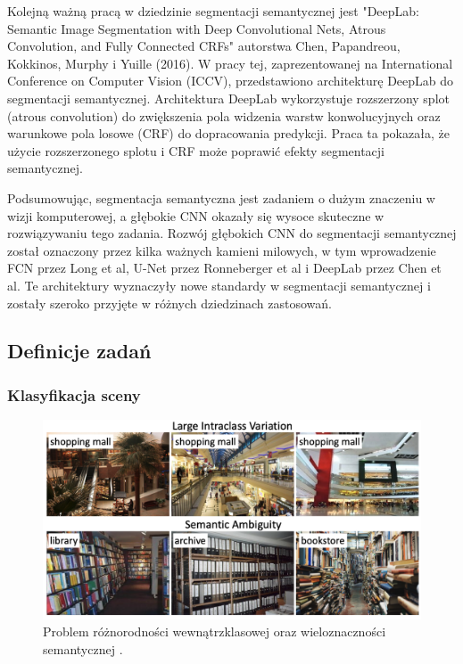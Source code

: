 Kolejną ważną pracą w dziedzinie segmentacji semantycznej jest "DeepLab: Semantic Image Segmentation with Deep Convolutional Nets, Atrous Convolution, and Fully Connected CRFs" autorstwa Chen, Papandreou, Kokkinos, Murphy i Yuille (2016)\cite{deeplab}. W pracy tej, zaprezentowanej na International Conference on Computer Vision (ICCV), przedstawiono architekturę DeepLab do segmentacji semantycznej. Architektura DeepLab wykorzystuje rozszerzony splot (atrous convolution) do zwiększenia pola widzenia warstw konwolucyjnych oraz warunkowe pola losowe (CRF) do dopracowania predykcji. Praca ta pokazała, że użycie rozszerzonego splotu i CRF może poprawić efekty segmentacji semantycznej.

Podsumowując, segmentacja semantyczna jest zadaniem o dużym znaczeniu w wizji komputerowej, a głębokie CNN okazały się wysoce skuteczne w rozwiązywaniu tego zadania. Rozwój głębokich CNN do segmentacji semantycznej został oznaczony przez kilka ważnych kamieni milowych, w tym wprowadzenie FCN przez Long et al, U-Net przez Ronneberger et al i DeepLab przez Chen et al. Te architektury wyznaczyły nowe standardy w segmentacji semantycznej i zostały szeroko przyjęte w różnych dziedzinach zastosowań.
\subsection{Definicje zadań}
\subsubsection{Klasyfikacja sceny}
\begin{figure}[ht!]
    \includegraphics[width=\textwidth]{img/scene_class.png}
    \caption{Problem różnorodności wewnątrzklasowej oraz wieloznaczności semantycznej \cite{zeng2021deep}.}
    \label{fig:scene-class}
\end{figure}

